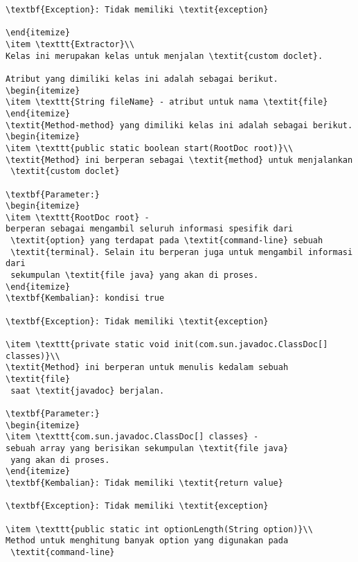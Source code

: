 \begin{lstlisting}[caption=Hasil Pengujian Kedua]
\textbf{Exception}: Tidak memiliki \textit{exception}

\end{itemize}
\item \texttt{Extractor}\\ 
Kelas ini merupakan kelas untuk menjalan \textit{custom doclet}.

Atribut yang dimiliki kelas ini adalah sebagai berikut.
\begin{itemize}
\item \texttt{String fileName} - atribut untuk nama \textit{file}
\end{itemize}
\textit{Method-method} yang dimiliki kelas ini adalah sebagai berikut.
\begin{itemize}
\item \texttt{public static boolean start(RootDoc root)}\\ 
\textit{Method} ini berperan sebagai \textit{method} untuk menjalankan
 \textit{custom doclet}

\textbf{Parameter:}
\begin{itemize}
\item \texttt{RootDoc root} - 
berperan sebagai mengambil seluruh informasi spesifik dari
 \textit{option} yang terdapat pada \textit{command-line} sebuah
 \textit{terminal}. Selain itu berperan juga untuk mengambil informasi dari
 sekumpulan \textit{file java} yang akan di proses.
\end{itemize}
\textbf{Kembalian}: kondisi true

\textbf{Exception}: Tidak memiliki \textit{exception}

\item \texttt{private static void init(com.sun.javadoc.ClassDoc[] classes)}\\ 
\textit{Method} ini berperan untuk menulis kedalam sebuah \textit{file}
 saat \textit{javadoc} berjalan.

\textbf{Parameter:}
\begin{itemize}
\item \texttt{com.sun.javadoc.ClassDoc[] classes} - 
sebuah array yang berisikan sekumpulan \textit{file java}
 yang akan di proses.
\end{itemize}
\textbf{Kembalian}: Tidak memiliki \textit{return value}

\textbf{Exception}: Tidak memiliki \textit{exception}

\item \texttt{public static int optionLength(String option)}\\ 
Method untuk menghitung banyak option yang digunakan pada
 \textit{command-line}


\end{lstlisting}
